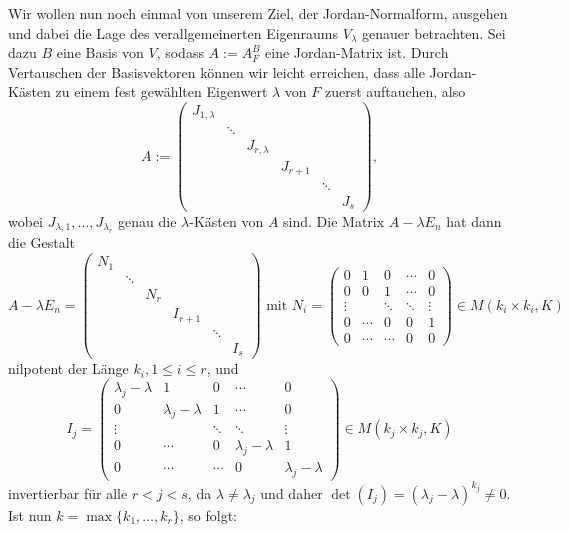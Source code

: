 \begin{bemerkung}
	\label{bem:9.14}
	Wir wollen nun noch einmal von unserem Ziel, der Jordan-Normalform, ausgehen und dabei die Lage des verallgemeinerten Eigenraums $V_\lambda$ genauer betrachten.
	Sei dazu $B$ eine Basis von $V$, sodass $A := A_F^B$ eine Jordan-Matrix ist.
	Durch Vertauschen der Basisvektoren können wir leicht erreichen, dass alle Jordan-Kästen zu einem fest gewählten Eigenwert $\lambda$ von $F$ zuerst auftauchen, also
	\[
		A:= \begin{pmatrix}
			J_{1,\lambda} &        &               &         &        &  \\
			              & \ddots &               &         &        &  \\
			              &        & J_{r,\lambda} &         &        &  \\
			              &        &               & J_{r+1} &        &  \\
			              &        &               &         & \ddots &  \\
			              &        &               &         &        & J_s
		\end{pmatrix},
	\]
	wobei $J_{\lambda,1},\dots,J_{\lambda_r}$ genau die $\lambda$-Kästen von $A$ sind.
	Die Matrix $A - \lambda E_n$ hat dann die Gestalt
	\[
		A - \lambda E_n = \begin{pmatrix}
		N_1 &        &               &         &        &  \\
		& \ddots &               &         &        &  \\
		&        & N_r &         &        &  \\
		&        &               & I_{r+1} &        &  \\
		&        &               &         & \ddots &  \\
		&        &               &         &        & I_s
		\end{pmatrix} \text{ mit } N_i = \begin{pmatrix}
		0 & 1 & 0 & \cdots & 0 \\ 
		0 & 0 & 1 & \cdots & 0 \\ 
		\vdots &  & \ddots & \ddots & \vdots \\ 
		0 & \cdots & 0 & 0 & 1 \\ 
		0 & \cdots & \cdots & 0 & 0
		\end{pmatrix} \in M(k_i \times k_i,K)
	\]
	nilpotent der Länge $k_i, 1 \leq i \leq r$, und
	\[
		I_j = \begin{pmatrix}
		\lambda_j - \lambda & 1 & 0 & \cdots & 0 \\ 
		0 & \lambda_j - \lambda & 1 & \cdots & 0 \\ 
		\vdots &  & \ddots & \ddots & \vdots \\ 
		0 & \cdots & 0 & \lambda_j - \lambda & 1 \\ 
		0 & \cdots & \cdots & 0 & \lambda_j - \lambda
		\end{pmatrix} \in M(k_j \times k_j,K)
	\]
	invertierbar für alle $r < j < s$, da $\lambda \neq \lambda_j$ und daher $\det(I_j) = (\lambda_j - \lambda)^{k_j} \neq 0$.
	Ist nun $k = \max\{k_1,\dots,k_r\}$, so folgt:
	

\end{bemerkung}
